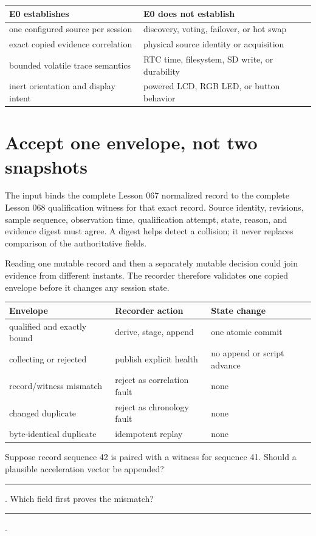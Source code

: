 \documentclass[10pt]{article}
\newcommand{\blankline}{\rule{0.80in}{0.4pt}}
\newcommand{\longblank}{\rule{1.45in}{0.4pt}}
\begin{document}
\begin{tabularx}{\linewidth}{@{}X X@{}}
\toprule
E0 establishes & E0 does not establish\\
\midrule
one configured source per session & discovery, voting, failover, or hot swap\\
exact copied evidence correlation & physical source identity or acquisition\\
bounded volatile trace semantics & RTC time, filesystem, SD write, or durability\\
inert orientation and display intent & powered LCD, RGB LED, or button behavior\\
\bottomrule
\end{tabularx}

\newpage
\section{Accept one envelope, not two snapshots}
The input binds the complete Lesson 067 normalized record to the complete
Lesson 068 qualification witness for that exact record. Source identity,
revisions, sample sequence, observation time, qualification attempt, state,
reason, and evidence digest must agree. A digest helps detect a collision; it
never replaces comparison of the authoritative fields.

Reading one mutable record and then a separately mutable decision could join
evidence from different instants. The recorder therefore validates one copied
envelope before it changes any session state.

\begin{tabularx}{\linewidth}{@{}l X X@{}}
\toprule
Envelope & Recorder action & State change\\
\midrule
qualified and exactly bound & derive, stage, append & one atomic commit\\
collecting or rejected & publish explicit health & no append or script advance\\
record/witness mismatch & reject as correlation fault & none\\
changed duplicate & reject as chronology fault & none\\
byte-identical duplicate & idempotent replay & none\\
\bottomrule
\end{tabularx}

Suppose record sequence 42 is paired with a witness for sequence 41. Should a
plausible acceleration vector be appended? \blankline. Which field first
proves the mismatch? \longblank.
\end{document}
